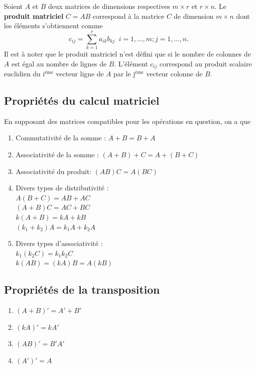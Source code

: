 \begin{defn}
Soient $A$ et $B$ deux matrices de dimensions respectives $m\times r$ et $r\times n$. Le \textbf{produit matriciel} $C=AB$ correspond à la matrice $C$ de dimension $m\times n$ dont les éléments s'obtiennent comme
$$c_{ij}=\sum_{k=1}^r a_{ik}b_{kj}\;\;i=1,\ldots,m; j=1,\ldots,n.$$
Il est à noter que le produit matriciel n'est défini que si le nombre de colonnes de $A$ est égal au nombre de lignes de $B$. L'élément $c_{ij}$ correspond au produit scalaire euclidien du i$^\text{ème}$ vecteur ligne de $A$ par le j$^\text{ème}$ vecteur colonne de $B$.
\end{defn}



\subsection{Propriétés du calcul matriciel}
\label{sec:prop_calc_mat}

En supposant des matrices compatibles pour les opérations en question, on a que

\begin{enumerate}
\item Commutativité de la somme : $A + B  =  B + A$
\item Associativité de la somme : $(A+B)+C  =  A+ (B+C)$
\item Associativité du produit:  $(AB)C=A(BC)$
\item Divers types de distributivité :\\
$A(B+C)=AB+AC$ \\
$(A+B)C=AC+BC$ \\
$k(A+B)=kA+kB$ \\
$(k_1+k_2)A=k_1A+k_2A$
\item Divers types d'associativité : \\
$k_1(k_2C)=k_1k_2C$  \\
$k(AB)=(kA)B=A(kB)$
\end{enumerate}


\subsection{Propriétés de la transposition}
\label{sec:prop_transp}
\begin{enumerate}
\item
$(A+B)'=A'+B'$
\item
$(kA)'=kA'$
\item
$(AB)'=B'A'$
\item
$(A')'=A$
\end{enumerate}

